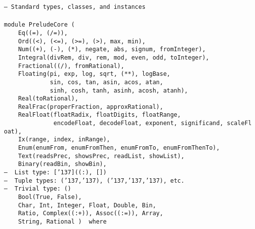 \noindent\bprogB
\mbox{\tt --\ Standard\ types,\ classes,\ and\ instances}\\
\mbox{\tt }\\
\mbox{\tt module\ PreludeCore\ (}\\
\mbox{\tt \ \ \ \ Eq((=),\ (/=)),}\\
\mbox{\tt \ \ \ \ Ord((<),\ (<=),\ (>=),\ (>),\ max,\ min),}\\
\mbox{\tt \ \ \ \ Num((+),\ (-),\ (*),\ negate,\ abs,\ signum,\ fromInteger),}\\
\mbox{\tt \ \ \ \ Integral(divRem,\ div,\ rem,\ mod,\ even,\ odd,\ toInteger),}\\
\mbox{\tt \ \ \ \ Fractional((/),\ fromRational),}\\
\mbox{\tt \ \ \ \ Floating(pi,\ exp,\ log,\ sqrt,\ (**),\ logBase,}\\
\mbox{\tt \ \ \ \ \ \ \ \ \ \ \ \ \ sin,\ cos,\ tan,\ asin,\ acos,\ atan,}\\
\mbox{\tt \ \ \ \ \ \ \ \ \ \ \ \ \ sinh,\ cosh,\ tanh,\ asinh,\ acosh,\ atanh),}\\
\mbox{\tt \ \ \ \ Real(toRational),}\\
\mbox{\tt \ \ \ \ RealFrac(properFraction,\ approxRational),}\\
\mbox{\tt \ \ \ \ RealFloat(floatRadix,\ floatDigits,\ floatRange,}\\
\mbox{\tt \ \ \ \ \ \ \ \ \ \ \ \ \ \ encodeFloat,\ decodeFloat,\ exponent,\ significand,\ scaleFloat),}\\
\mbox{\tt \ \ \ \ Ix(range,\ index,\ inRange),}\\
\mbox{\tt \ \ \ \ Enum(enumFrom,\ enumFromThen,\ enumFromTo,\ enumFromThenTo),}\\
\mbox{\tt \ \ \ \ Text(readsPrec,\ showsPrec,\ readList,\ showList),}\\
\mbox{\tt \ \ \ \ Binary(readBin,\ showBin),}\\
\mbox{\tt --\ \ List\ type:\ [{\char'137}]((:),\ [])}\\
\mbox{\tt --\ \ Tuple\ types:\ ({\char'137},{\char'137}),\ ({\char'137},{\char'137},{\char'137}),\ etc.}\\
\mbox{\tt --\ \ Trivial\ type:\ ()\ }\\
\mbox{\tt \ \ \ \ Bool(True,\ False),}\\
\mbox{\tt \ \ \ \ Char,\ Int,\ Integer,\ Float,\ Double,\ Bin,}\\
\mbox{\tt \ \ \ \ Ratio,\ Complex((:+)),\ Assoc((:=)),\ Array,}\\
\mbox{\tt \ \ \ \ String,\ Rational\ )\ \ where}
